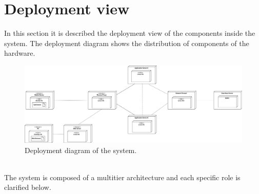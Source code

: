 \documentclass{report}
\begin{document}
\section{Deployment view}
In this section it is described the deployment view of the components inside the system. The deployment diagram shows the distribution of components of the hardware.
\begin{figure}[!ht]
	\begin{center}
	\includegraphics[width=\textwidth]{img/DeploymentView.png}
    \end{center}
    \label{fig:deploymentview}
	\caption{Deployment diagram of the system.}
\end{figure}\\
The system is composed of a multitier architecture and each specific role is clarified below.\\
\end{document}
